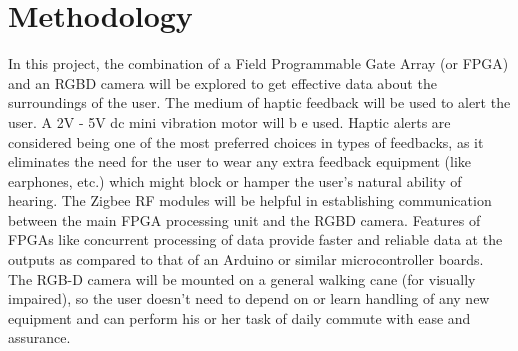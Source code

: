 \documentclass[conference]{IEEEtran}
\begin{document}
\section{Methodology}\label{SCM}
In this project, the combination of a Field Programmable Gate Array (or FPGA) and an RGBD camera will be explored to get effective data about the surroundings of the user. The medium of haptic feedback will be used to alert the user. A 2V - 5V dc mini vibration motor will b e used. Haptic alerts are considered being one of the most preferred choices in types of feedbacks, as it eliminates the need for the user to wear any extra feedback equipment (like earphones, etc.) which might block or hamper the user’s natural ability of hearing. The Zigbee RF modules will be helpful in establishing communication between the main FPGA processing unit and the RGBD camera. Features of FPGAs like concurrent processing of data provide faster and reliable data at the outputs as compared to that of an Arduino or similar microcontroller boards. The RGB-D camera will be mounted on a general walking cane (for visually impaired), so the user doesn’t need to depend on or learn handling of any new equipment and can perform his or her task of daily commute with ease and assurance.
\end{document}
